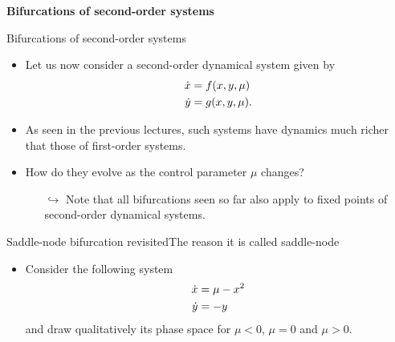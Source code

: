 \documentclass[usenames,dvipsnames,svgnames,10pt,aspectratio=169]{beamer}
\begin{document}
\begin{frame}[t, c]{}
	\centering
	\vspace{1cm}

	{\Large \textbf{Bifurcations of second-order systems}}

	\bigskip

	{}

\end{frame}

\begin{frame}[t, c]{Bifurcations of second-order systems}{}
	\begin{itemize}
		\item Let us now consider a second-order dynamical system given by
		\begin{equation}
			\begin{aligned}
				\dot{x} & = f(x, y, \mu) \\
				\dot{y} & = g(x, y, \mu).
			\end{aligned}
			\notag
		\end{equation}

		\item As seen in the previous lectures, such systems have dynamics much richer that those of first-order systems.

		\medskip

		\item How do they evolve as the control parameter $\mu$ changes?
		\begin{itemize}
			\item[$\hookrightarrow$] Note that all bifurcations seen so far also apply to fixed points of second-order dynamical systems.
		\end{itemize}
	\end{itemize}

	\vspace{1cm}
\end{frame}

\begin{frame}[t, c]{Saddle-node bifurcation revisited}{The reason it is called saddle-node}
	\begin{itemize}
		\item Consider the following system
		\begin{equation}
			\begin{aligned}
				\dot{x} & = \mu - x^2 \\
				\dot{y} & = - y
			\end{aligned}
			\notag
		\end{equation}
		and draw qualitatively its phase space for $\mu < 0$, $\mu = 0$ and $\mu > 0$.
	\end{itemize}

	\vspace{1cm}
\end{frame}
\end{document}
